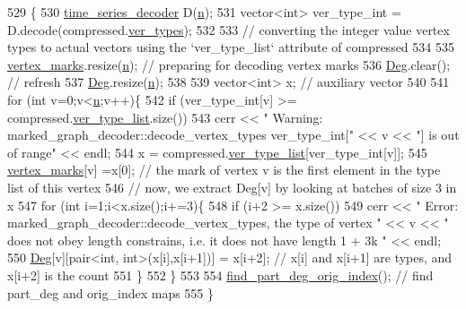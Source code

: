 \begin{DoxyCode}
529 \{
530   \hyperlink{classtime__series__decoder}{time\_series\_decoder} D(\hyperlink{classmarked__graph__decoder_aefc93611bc4a3e9a5d3956d97649a0e9}{n});
531   vector<int> ver\_type\_int = D.decode(compressed.\hyperlink{classmarked__graph__compressed_af446cc5e23c241a92b76642fd5ebc403}{ver\_types});
532 
533   \textcolor{comment}{// converting the integer value vertex types to actual vectors using the `ver\_type\_list` attribute of
       compressed}
534 
535   \hyperlink{classmarked__graph__decoder_a98be932a5abff7efbc8dd4290268b69a}{vertex\_marks}.resize(\hyperlink{classmarked__graph__decoder_aefc93611bc4a3e9a5d3956d97649a0e9}{n}); \textcolor{comment}{// preparing for decoding vertex marks}
536   \hyperlink{classmarked__graph__decoder_a5040ad86467693eab415f615408bfb9e}{Deg}.clear(); \textcolor{comment}{// refresh}
537   \hyperlink{classmarked__graph__decoder_a5040ad86467693eab415f615408bfb9e}{Deg}.resize(\hyperlink{classmarked__graph__decoder_aefc93611bc4a3e9a5d3956d97649a0e9}{n});
538 
539   vector<int> x; \textcolor{comment}{// auxiliary vector}
540 
541   \textcolor{keywordflow}{for} (\textcolor{keywordtype}{int} v=0;v<\hyperlink{classmarked__graph__decoder_aefc93611bc4a3e9a5d3956d97649a0e9}{n};v++)\{
542     \textcolor{keywordflow}{if} (ver\_type\_int[v] >= compressed.\hyperlink{classmarked__graph__compressed_af2e3e55223d436628a02758dfae88493}{ver\_type\_list}.size())
543       cerr << \textcolor{stringliteral}{" Warning: marked\_graph\_decoder::decode\_vertex\_types ver\_type\_int["} << v << \textcolor{stringliteral}{"] is out of
       range"} << endl;
544     x = compressed.\hyperlink{classmarked__graph__compressed_af2e3e55223d436628a02758dfae88493}{ver\_type\_list}[ver\_type\_int[v]];
545     \hyperlink{classmarked__graph__decoder_a98be932a5abff7efbc8dd4290268b69a}{vertex\_marks}[v] =x[0]; \textcolor{comment}{// the mark of vertex v is the first element in the type list of
       this vertex}
546     \textcolor{comment}{// now, we extract Deg[v] by looking at batches of size 3 in x}
547     \textcolor{keywordflow}{for} (\textcolor{keywordtype}{int} i=1;i<x.size();i+=3)\{
548       \textcolor{keywordflow}{if} (i+2 >= x.size())
549         cerr << \textcolor{stringliteral}{" Error: marked\_graph\_decoder::decode\_vertex\_types, the type of vertex "} << v << \textcolor{stringliteral}{" does not
       obey length constrains, i.e. it does not have length 1 + 3k "} << endl;
550           \hyperlink{classmarked__graph__decoder_a5040ad86467693eab415f615408bfb9e}{Deg}[v][pair<int, int>(x[i],x[i+1])] = x[i+2]; \textcolor{comment}{// x[i] and x[i+1] are types, and x[i+2] is the
       count}
551     \}
552   \}
553 
554   \hyperlink{classmarked__graph__decoder_a1e035914395d2a3a50064b758c478ffd}{find\_part\_deg\_orig\_index}(); \textcolor{comment}{// find part\_deg and orig\_index maps}
555 \}
\end{DoxyCode}

